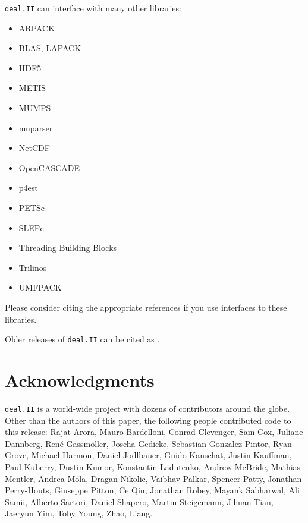 \documentclass{ansarticle-preprint}
\newcommand{\specialword}[1]{\texttt{#1}}
\newcommand{\dealii}{{\specialword{deal.II}}}
\begin{document}
\dealii{} can interface with many other libraries:
\begin{multicols}{2}
\begin{itemize}
\item ARPACK \cite{arpack}
\item BLAS, LAPACK
\item HDF5 \cite{hdf5}
\item METIS \cite{karypis1998fast}
\item MUMPS \cite{ADE00,MUMPS:1,MUMPS:2,mumps-web-page}
\item muparser \cite{muparser-web-page}
\item NetCDF \cite{rew1990netcdf}
\item OpenCASCADE \cite{opencascade-web-page}
\item p4est \cite{p4est}
\item PETSc \cite{petsc-user-ref,petsc-web-page}
\item SLEPc \cite{Hernandez:2005:SSF}
\item Threading Building Blocks \cite{Rei07}
\item Trilinos \cite{trilinos,trilinos-web-page}
\item UMFPACK \cite{umfpack}
\end{itemize}
\end{multicols}
Please consider citing the appropriate references if you use interfaces to these
libraries.

Older releases of \dealii{} can be cited as \cite{dealII80,dealII81,dealII82,dealII83,dealII84}.

\nocite{BangerthKanschat1999}

\section{Acknowledgments}

\dealii{} is a world-wide project with dozens of contributors around the
globe. Other than the authors of this paper, the following people contributed code to
this release:
%
%
Rajat  Arora,
Mauro  Bardelloni,
Conrad  Clevenger,
Sam  Cox,
Juliane  Dannberg,
Ren{\'e}  Gassm{\"o}ller,
Joscha  Gedicke,
Sebastian  Gonzalez-Pintor,
Ryan  Grove,
Michael  Harmon,
Daniel  Jodlbauer,
Guido  Kanschat,
Justin  Kauffman,
Paul  Kuberry,
Dustin  Kumor,
Konstantin  Ladutenko,
Andrew  McBride,
Mathias  Mentler,
Andrea  Mola,
Dragan  Nikolic,
Vaibhav  Palkar,
Spencer  Patty,
Jonathan  Perry-Houts,
Giuseppe  Pitton,
Ce  Qin,
Jonathan  Robey,
Mayank  Sabharwal,
Ali  Samii,
Alberto  Sartori,
Daniel  Shapero,
Martin  Steigemann,
Jihuan  Tian,
Jaeryun  Yim,
Toby  Young,
Zhao, Liang.
\end{document}
